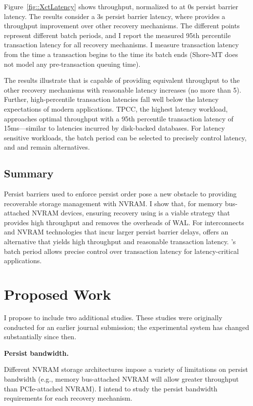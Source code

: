 Figure~\ref{fig::XctLatency} shows throughput, normalized to \InPlace at 0\textmu s persist barrier latency.
The results consider a 3\textmu s persist barrier latency, where \GroupCommit provides a throughput improvement over other recovery mechanisms.
The different \GroupCommit points represent different batch periods, and I report the measured 95th percentile transaction latency for all recovery mechanisms.
I measure transaction latency from the time a transaction begins to the time its batch ends (Shore-MT does not model any pre-transaction queuing time).

The results illustrate that \GroupCommit is capable of providing equivalent throughput to the other recovery mechanisms with reasonable latency increases (no more than 5\texttimes).
Further, high-percentile transaction latencies fall well below the latency expectations of modern applications.
TPCC, the highest latency workload, approaches optimal throughput with a 95th percentile transaction latency of 15ms---similar to latencies incurred by disk-backed databases.
For latency sensitive workloads, the batch period can be selected to precisely control latency, and \InPlace and \NVDisk remain alternatives.

\subsection{Summary}
\label{sec:OLTP_eval:Persists:Summary}
Persist barriers used to enforce persist order pose a new obstacle to providing recoverable storage management with NVRAM.
I show that, for memory bus-attached NVRAM devices, ensuring recovery using \InPlace is a viable strategy that provides high throughput and removes the overheads of WAL.
For interconnects and NVRAM technologies that incur larger persist barrier delays, \GroupCommit offers an alternative that yields high throughput and reasonable transaction latency.
\GroupCommit's batch period allows precise control over transaction latency for latency-critical applications.

\section{Proposed Work}
\label{sec:OLTP_eval:Proposed}

I propose to include two additional studies.
These studies were originally conducted for an earlier journal submission; the experimental system has changed substantially since then.

\textbf{Persist bandwidth.}

Different NVRAM storage architectures impose a variety of limitations on persist bandwidth (e.g., memory bus-attached NVRAM will allow greater throughput than PCIe-attached NVRAM).
I intend to study the persist bandwidth requirements for each recovery mechanism.

